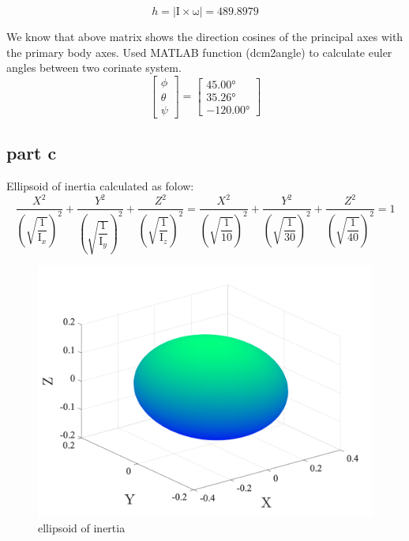$$
h = |\boldsymbol{\mathrm{I}} \times \boldsymbol{\mathrm{\omega}}| = 489.8979
$$

We know that above matrix shows the direction cosines of the principal axes with the primary body axes. Used MATLAB function (dcm2angle) to calculate euler angles between two corinate system.
$$
\begin{bmatrix}
    \phi\\
    \theta\\
    \psi 
\end{bmatrix} = \begin{bmatrix}
  \ang{45.00}\\
  \ang{35.26}\\
  \ang{-120.00}
\end{bmatrix}
$$

\subsection{part c}
Ellipsoid of inertia calculated as folow:
\begin{equation}
    \dfrac{X^2}{\left(\sqrt{\dfrac{1}{\mathrm{I}_x}}\right)^2} + 
    \dfrac{Y^2}{\left(\sqrt{\dfrac{1}{\mathrm{I}_y}}\right)^2} + 
    \dfrac{Z^2}{\left(\sqrt{\dfrac{1}{\mathrm{I}_z}}\right)^2} =
    \dfrac{X^2}{\left(\sqrt{\dfrac{1}{10}}\right)^2} + 
    \dfrac{Y^2}{\left(\sqrt{\dfrac{1}{30}}\right)^2} + 
    \dfrac{Z^2}{\left(\sqrt{\dfrac{1}{40}}\right)^2} =
     1
\end{equation} 

\begin{figure}[H]
    \caption{ellipsoid of inertia}
    \centering
    \includegraphics[width=17cm]{../Figure/Q1/3Dof_view_elipsoid_inertia}
\end{figure}

